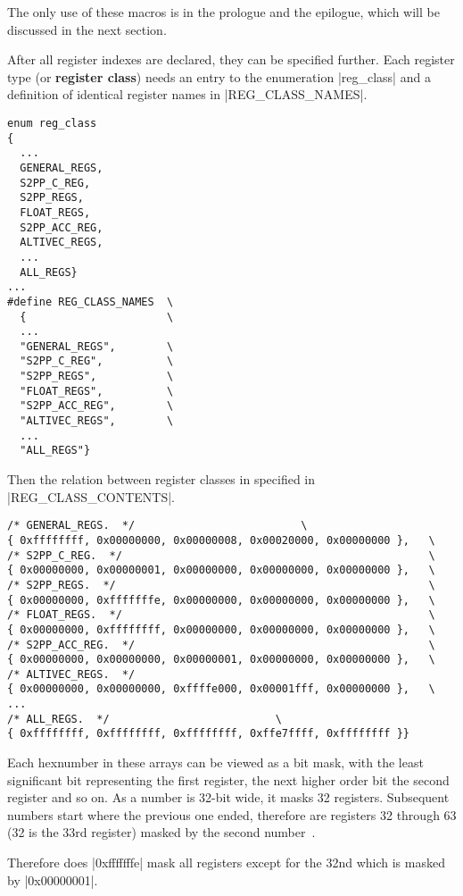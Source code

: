 The only use of these macros is in the prologue and the epilogue, which will be discussed in the next section.

After all register indexes are declared, they can be specified further.
Each register type (or \textbf{register class}) needs an entry to the enumeration |reg_class| and a definition of identical register names in |REG_CLASS_NAMES|.
\begin{lstlisting}[multicols=2]
enum reg_class
{
  ...
  GENERAL_REGS,
  S2PP_C_REG,
  S2PP_REGS,
  FLOAT_REGS,
  S2PP_ACC_REG,
  ALTIVEC_REGS,
  ...
  ALL_REGS}
...
#define REG_CLASS_NAMES  \
  {                      \
  ...
  "GENERAL_REGS",        \
  "S2PP_C_REG",          \
  "S2PP_REGS",           \
  "FLOAT_REGS",          \
  "S2PP_ACC_REG",        \
  "ALTIVEC_REGS",        \
  ...
  "ALL_REGS"}
  \end{lstlisting}

Then the relation between register classes in specified in |REG_CLASS_CONTENTS|.
\begin{lstlisting}
/* GENERAL_REGS.  */                          \
{ 0xffffffff, 0x00000000, 0x00000008, 0x00020000, 0x00000000 },   \
/* S2PP_C_REG.  */                                                \
{ 0x00000000, 0x00000001, 0x00000000, 0x00000000, 0x00000000 },   \
/* S2PP_REGS.  */                                                 \
{ 0x00000000, 0xfffffffe, 0x00000000, 0x00000000, 0x00000000 },   \
/* FLOAT_REGS.  */                                                \
{ 0x00000000, 0xffffffff, 0x00000000, 0x00000000, 0x00000000 },   \
/* S2PP_ACC_REG.  */                                              \
{ 0x00000000, 0x00000000, 0x00000001, 0x00000000, 0x00000000 },   \
/* ALTIVEC_REGS.  */
{ 0x00000000, 0x00000000, 0xffffe000, 0x00001fff, 0x00000000 },   \
...
/* ALL_REGS.  */                          \
{ 0xffffffff, 0xffffffff, 0xffffffff, 0xffe7ffff, 0xffffffff }}
\end{lstlisting}

Each hexnumber in these arrays can be viewed as a bit mask, with the least significant bit representing the first register, the next higher order bit the second register and so on.
As a number is 32-bit wide, it masks 32 registers.
Subsequent numbers start where the previous one ended, therefore are registers 32 through 63 (32 is the 33rd register) masked by the second number~\cite[ch.l~17.8]{GCCint}.

Therefore does |0xfffffffe| mask all registers except for the 32nd which is masked by |0x00000001|.

